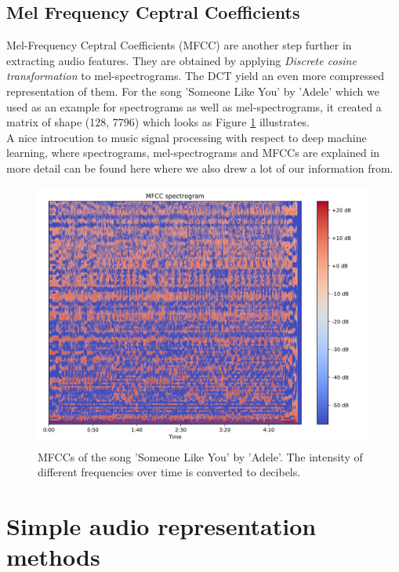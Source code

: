 \subsection{Mel Frequency Ceptral Coefficients}
Mel-Frequency Ceptral Coefficients (MFCC) are another step further in extracting audio features. They are obtained by applying \textit{Discrete cosine transformation} to mel-spectrograms. The DCT yield an even more compressed representation of them. For the song 'Someone Like You' by 'Adele' which we used as an example for spectrograms as well as mel-spectrograms, it created a matrix of shape (128, 7796) which looks as Figure \ref{fig:ilustrative_mfccs} illustrates.\\

A nice introcution to music signal processing with respect to deep machine learning, where spectrograms, mel-spectrograms and MFCCs are explained in more detail can be found here \cite{Schluter2017} where we also drew a lot of our information from.

\begin{figure}[h!]
    \centering
	\includegraphics[width=140mm]{./img/mfccs.png}
	\caption{MFCCs of the song 'Someone Like You' by 'Adele'. The intensity of different frequencies over time is converted to decibels.}
	\label{fig:ilustrative_mfccs}
\end{figure}

\section{Simple audio representation methods}\label{sec:audio_machine_learning}

